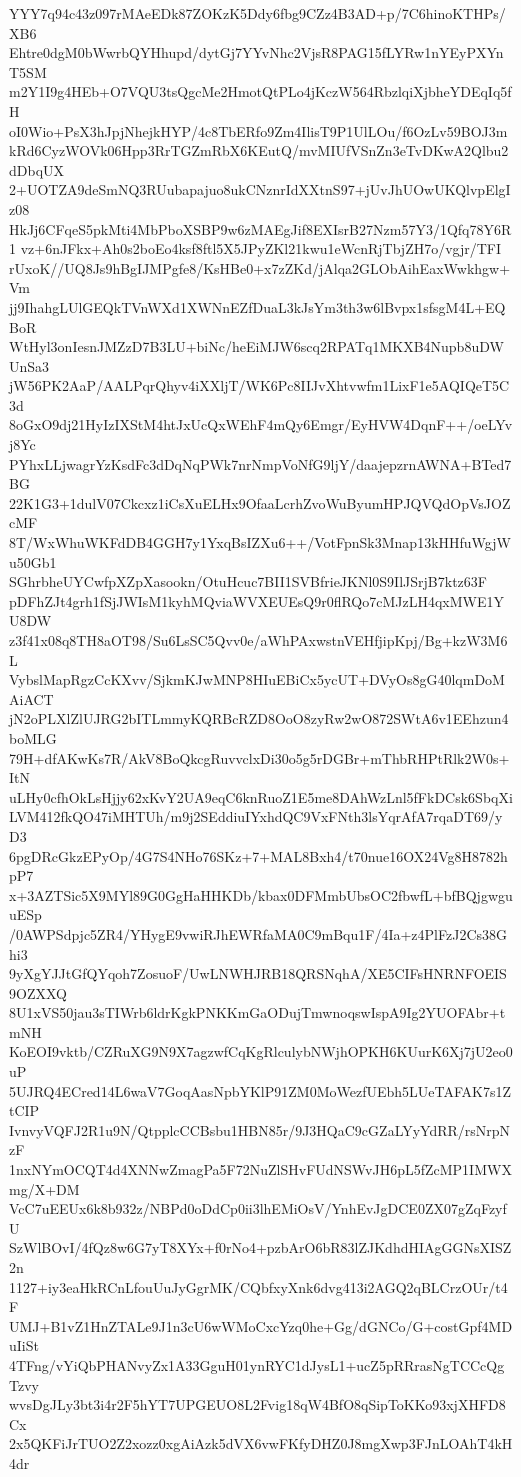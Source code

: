 YYY7q94c43z097rMAeEDk87ZOKzK5Ddy6fbg9CZz4B3AD+p/7C6hinoKTHPs/XB6
Ehtre0dgM0bWwrbQYHhupd/dytGj7YYvNhc2VjsR8PAG15fLYRw1nYEyPXYnT5SM
m2Y1I9g4HEb+O7VQU3tsQgcMe2HmotQtPLo4jKczW564RbzlqiXjbheYDEqIq5fH
oI0Wio+PsX3hJpjNhejkHYP/4c8TbERfo9Zm4IlisT9P1UlLOu/f6OzLv59BOJ3m
kRd6CyzWOVk06Hpp3RrTGZmRbX6KEutQ/mvMIUfVSnZn3eTvDKwA2Qlbu2dDbqUX
2+UOTZA9deSmNQ3RUubapajuo8ukCNznrIdXXtnS97+jUvJhUOwUKQlvpElgIz08
HkJj6CFqeS5pkMti4MbPboXSBP9w6zMAEgJif8EXIsrB27Nzm57Y3/1Qfq78Y6R1
vz+6nJFkx+Ah0s2boEo4ksf8ftl5X5JPyZKl21kwu1eWcnRjTbjZH7o/vgjr/TFI
rUxoK//UQ8Js9hBgIJMPgfe8/KsHBe0+x7zZKd/jAlqa2GLObAihEaxWwkhgw+Vm
jj9IhahgLUlGEQkTVnWXd1XWNnEZfDuaL3kJsYm3th3w6lBvpx1sfsgM4L+EQBoR
WtHyl3onIesnJMZzD7B3LU+biNc/heEiMJW6scq2RPATq1MKXB4Nupb8uDWUnSa3
jW56PK2AaP/AALPqrQhyv4iXXljT/WK6Pc8IIJvXhtvwfm1LixF1e5AQIQeT5C3d
8oGxO9dj21HyIzIXStM4htJxUcQxWEhF4mQy6Emgr/EyHVW4DqnF++/oeLYvj8Yc
PYhxLLjwagrYzKsdFc3dDqNqPWk7nrNmpVoNfG9ljY/daajepzrnAWNA+BTed7BG
22K1G3+1dulV07Ckcxz1iCsXuELHx9OfaaLcrhZvoWuByumHPJQVQdOpVsJOZcMF
8T/WxWhuWKFdDB4GGH7y1YxqBsIZXu6++/VotFpnSk3Mnap13kHHfuWgjWu50Gb1
SGhrbheUYCwfpXZpXasookn/OtuHcuc7BII1SVBfrieJKNl0S9IlJSrjB7ktz63F
pDFhZJt4grh1fSjJWIsM1kyhMQviaWVXEUEsQ9r0flRQo7cMJzLH4qxMWE1YU8DW
z3f41x08q8TH8aOT98/Su6LsSC5Qvv0e/aWhPAxwstnVEHfjipKpj/Bg+kzW3M6L
VybslMapRgzCcKXvv/SjkmKJwMNP8HIuEBiCx5ycUT+DVyOs8gG40lqmDoMAiACT
jN2oPLXlZlUJRG2bITLmmyKQRBcRZD8OoO8zyRw2wO872SWtA6v1EEhzun4boMLG
79H+dfAKwKs7R/AkV8BoQkcgRuvvclxDi30o5g5rDGBr+mThbRHPtRlk2W0s+ItN
uLHy0cfhOkLsHjjy62xKvY2UA9eqC6knRuoZ1E5me8DAhWzLnl5fFkDCsk6SbqXi
LVM412fkQO47iMHTUh/m9j2SEddiuIYxhdQC9VxFNth3lsYqrAfA7rqaDT69/yD3
6pgDRcGkzEPyOp/4G7S4NHo76SKz+7+MAL8Bxh4/t70nue16OX24Vg8H8782hpP7
x+3AZTSic5X9MYl89G0GgHaHHKDb/kbax0DFMmbUbsOC2fbwfL+bfBQjgwguuESp
/0AWPSdpjc5ZR4/YHygE9vwiRJhEWRfaMA0C9mBqu1F/4Ia+z4PlFzJ2Cs38Ghi3
9yXgYJJtGfQYqoh7ZosuoF/UwLNWHJRB18QRSNqhA/XE5CIFsHNRNFOEIS9OZXXQ
8U1xVS50jau3sTIWrb6ldrKgkPNKKmGaODujTmwnoqswIspA9Ig2YUOFAbr+tmNH
KoEOI9vktb/CZRuXG9N9X7agzwfCqKgRlculybNWjhOPKH6KUurK6Xj7jU2eo0uP
5UJRQ4ECred14L6waV7GoqAasNpbYKlP91ZM0MoWezfUEbh5LUeTAFAK7s1ZtCIP
IvnvyVQFJ2R1u9N/QtpplcCCBsbu1HBN85r/9J3HQaC9cGZaLYyYdRR/rsNrpNzF
1nxNYmOCQT4d4XNNwZmagPa5F72NuZlSHvFUdNSWvJH6pL5fZcMP1IMWXmg/X+DM
VcC7uEEUx6k8b932z/NBPd0oDdCp0ii3lhEMiOsV/YnhEvJgDCE0ZX07gZqFzyfU
SzWlBOvI/4fQz8w6G7yT8XYx+f0rNo4+pzbArO6bR83lZJKdhdHIAgGGNsXISZ2n
1127+iy3eaHkRCnLfouUuJyGgrMK/CQbfxyXnk6dvg413i2AGQ2qBLCrzOUr/t4F
UMJ+B1vZ1HnZTALe9J1n3cU6wWMoCxcYzq0he+Gg/dGNCo/G+costGpf4MDuIiSt
4TFng/vYiQbPHANvyZx1A33GguH01ynRYC1dJysL1+ucZ5pRRrasNgTCCcQgTzvy
wvsDgJLy3bt3i4r2F5hYT7UPGEUO8L2Fvig18qW4BfO8qSipToKKo93xjXHFD8Cx
2x5QKFiJrTUO2Z2xozz0xgAiAzk5dVX6vwFKfyDHZ0J8mgXwp3FJnLOAhT4kH4dr
